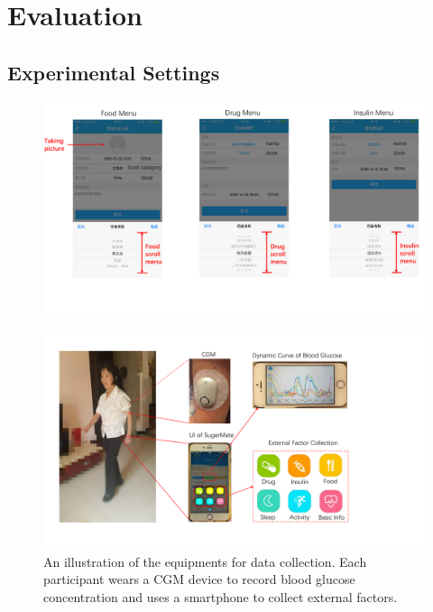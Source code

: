 \section{Evaluation}
\label{sec:eval}

\subsection{Experimental Settings}
\begin{figure}[h]
  \centering
  \includegraphics[width=0.9\columnwidth]{./img/usibility_UI.pdf}
  \caption{}
  \label{fig:usibility_UI}
\end{figure}
\begin{figure}[h]
  \centering
  \includegraphics[width=0.7\columnwidth]{./img/UI1.pdf}
  \caption{An illustration of the equipments for data collection. Each participant wears a CGM device to record blood glucose concentration and uses a smartphone to collect external factors. }
  \label{fig:experiment_case}
\end{figure}

